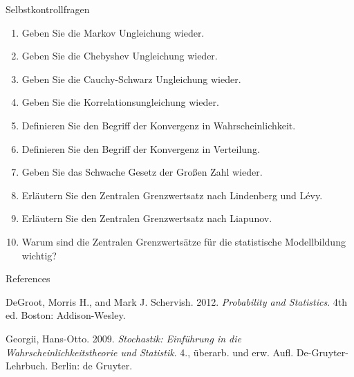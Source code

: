 \documentclass[
  8pt,
  ignorenonframetext,
]{beamer}
\newlength{\cslhangindent}
\newlength{\cslentryspacingunit} %
\newenvironment{CSLReferences}[2] %
 {%
  \setlength{\parindent}{0pt}
  \ifodd #1
  \let\oldpar\par
  \def\par{\hangindent=\cslhangindent\oldpar}
  \fi
  \setlength{\parskip}{#2\cslentryspacingunit}
 }%
 {}
\begin{document}
\begin{frame}{Selbstkontrollfragen}
\protect\hypertarget{selbstkontrollfragen}{}
\small
\begin{enumerate}
\item Geben Sie die Markov Ungleichung wieder.
\item Geben Sie die Chebyshev Ungleichung wieder.
\item Geben Sie die Cauchy-Schwarz Ungleichung wieder.
\item Geben Sie die Korrelationsungleichung wieder.
\item Definieren Sie den Begriff der Konvergenz in Wahrscheinlichkeit.
\item Definieren Sie den Begriff der Konvergenz in Verteilung.
\item Geben Sie das Schwache Gesetz der Großen Zahl wieder.
\item Erläutern Sie den Zentralen Grenzwertsatz nach Lindenberg und Lévy.
\item Erläutern Sie den Zentralen Grenzwertsatz nach Liapunov.
\item Warum sind die Zentralen Grenzwertsätze für die statistische Modellbildung wichtig?
\end{enumerate}
\end{frame}

\begin{frame}{References}
\protect\hypertarget{references}{}
\footnotesize

\hypertarget{refs}{}
\begin{CSLReferences}{1}{0}
\leavevmode{}%
DeGroot, Morris H., and Mark J. Schervish. 2012. \emph{Probability and
Statistics}. 4th ed. {Boston}: {Addison-Wesley}.

\leavevmode{}%
Georgii, Hans-Otto. 2009. \emph{{Stochastik: Einführung in die
Wahrscheinlichkeitstheorie und Statistik}}. 4., überarb. und erw. Aufl.
{De-Gruyter-Lehrbuch}. {Berlin}: {de Gruyter}.

\end{CSLReferences}
\end{frame}
\end{document}
